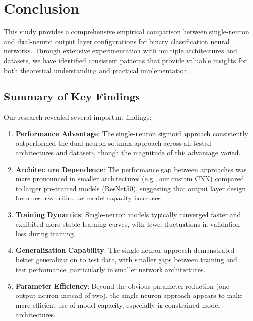 \section{Conclusion}

This study provides a comprehensive empirical comparison between single-neuron and dual-neuron output layer configurations for binary classification neural networks. Through extensive experimentation with multiple architectures and datasets, we have identified consistent patterns that provide valuable insights for both theoretical understanding and practical implementation.

\subsection{Summary of Key Findings}

Our research revealed several important findings:

\begin{enumerate}
\item \textbf{Performance Advantage}: The single-neuron sigmoid approach consistently outperformed the dual-neuron softmax approach across all tested architectures and datasets, though the magnitude of this advantage varied.

\item \textbf{Architecture Dependence}: The performance gap between approaches was more pronounced in smaller architectures (e.g., our custom CNN) compared to larger pre-trained models (ResNet50), suggesting that output layer design becomes less critical as model capacity increases.

\item \textbf{Training Dynamics}: Single-neuron models typically converged faster and exhibited more stable learning curves, with fewer fluctuations in validation loss during training.

\item \textbf{Generalization Capability}: The single-neuron approach demonstrated better generalization to test data, with smaller gaps between training and test performance, particularly in smaller network architectures.

\item \textbf{Parameter Efficiency}: Beyond the obvious parameter reduction (one output neuron instead of two), the single-neuron approach appears to make more efficient use of model capacity, especially in constrained model architectures.
\end{enumerate}

